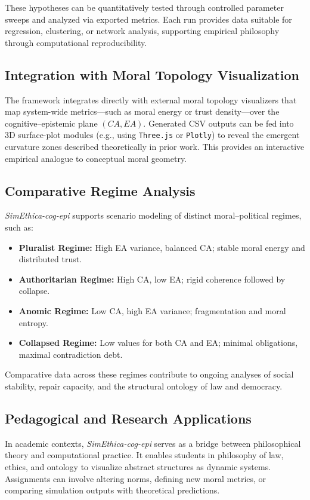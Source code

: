 \documentclass[11pt]{article}
\begin{document}
These hypotheses can be quantitatively tested through controlled parameter sweeps and analyzed via exported metrics.  
Each run provides data suitable for regression, clustering, or network analysis, supporting empirical philosophy through computational reproducibility.

\subsection{Integration with Moral Topology Visualization}

The framework integrates directly with external moral topology visualizers that map system-wide metrics—such as moral energy or trust density—over the cognitive–epistemic plane $(CA,EA)$.  
Generated CSV outputs can be fed into 3D surface-plot modules (e.g., using \texttt{Three.js} or \texttt{Plotly}) to reveal the emergent curvature zones described theoretically in prior work.  
This provides an interactive empirical analogue to conceptual moral geometry.

\subsection{Comparative Regime Analysis}

\textit{SimEthica-cog-epi} supports scenario modeling of distinct moral–political regimes, such as:
\begin{itemize}
  \item \textbf{Pluralist Regime:} High EA variance, balanced CA; stable moral energy and distributed trust.
  \item \textbf{Authoritarian Regime:} High CA, low EA; rigid coherence followed by collapse.
  \item \textbf{Anomic Regime:} Low CA, high EA variance; fragmentation and moral entropy.
  \item \textbf{Collapsed Regime:} Low values for both CA and EA; minimal obligations, maximal contradiction debt.
\end{itemize}

Comparative data across these regimes contribute to ongoing analyses of social stability, repair capacity, and the structural ontology of law and democracy.

\subsection{Pedagogical and Research Applications}

In academic contexts, \textit{SimEthica-cog-epi} serves as a bridge between philosophical theory and computational practice.  
It enables students in philosophy of law, ethics, and ontology to visualize abstract structures as dynamic systems.  
Assignments can involve altering norms, defining new moral metrics, or comparing simulation outputs with theoretical predictions.
\end{document}

